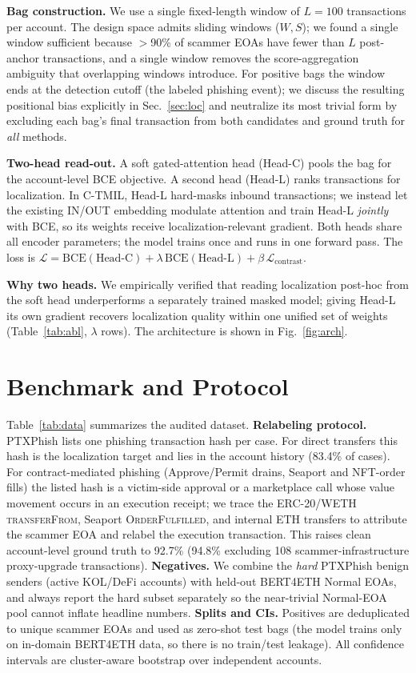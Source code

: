 \documentclass[conference]{IEEEtran}
\begin{document}
\noindent\textbf{Bag construction.} We use a single fixed-length window of
$L{=}100$ transactions per account. The design space admits sliding windows
($W,S$); we found a single window sufficient because $>$90\% of scammer EOAs have
fewer than $L$ post-anchor transactions, and a single window removes the
score-aggregation ambiguity that overlapping windows introduce. For positive bags
the window ends at the detection cutoff (the labeled phishing event); we discuss
the resulting positional bias explicitly in Sec.~\ref{sec:loc} and neutralize its
most trivial form by excluding each bag's final transaction from both candidates
and ground truth for \emph{all} methods.

\noindent\textbf{Two-head read-out.} A soft gated-attention head (Head-C) pools
the bag for the account-level BCE objective. A second head (Head-L) ranks
transactions for localization. In C-TMIL, Head-L hard-masks inbound transactions;
we instead let the existing IN/OUT embedding modulate attention and train Head-L
\emph{jointly} with BCE, so its weights receive localization-relevant gradient.
Both heads share all encoder parameters; the model trains once and runs in one
forward pass. The loss is $\mathcal{L}=\mathrm{BCE}(\text{Head-C})+\lambda\,
\mathrm{BCE}(\text{Head-L})+\beta\,\mathcal{L}_{\text{contrast}}$.

\noindent\textbf{Why two heads.} We empirically verified that reading localization
post-hoc from the soft head underperforms a separately trained masked model;
giving Head-L its own gradient recovers localization quality within one unified
set of weights (Table~\ref{tab:abl}, $\lambda$ rows). The architecture is shown in
Fig.~\ref{fig:arch}.

\section{Benchmark and Protocol}\label{sec:bench}
Table~\ref{tab:data} summarizes the audited dataset.
\textbf{Relabeling protocol.} PTXPhish lists one phishing transaction hash per
case. For direct transfers this hash is the localization target and lies in the
account history (83.4\% of cases). For contract-mediated phishing (Approve/Permit
drains, Seaport and NFT-order fills) the listed hash is a victim-side approval or a
marketplace call whose value movement occurs in an execution receipt; we trace the
ERC-20/WETH \textsc{transferFrom}, Seaport \textsc{OrderFulfilled}, and internal
ETH transfers to attribute the scammer EOA and relabel the execution transaction.
This raises clean account-level ground truth to 92.7\% (94.8\% excluding 108
scammer-infrastructure proxy-upgrade transactions).
\textbf{Negatives.} We combine the \emph{hard} PTXPhish benign senders (active
KOL/DeFi accounts) with held-out BERT4ETH Normal EOAs, and always report the hard
subset separately so the near-trivial Normal-EOA pool cannot inflate headline
numbers.
\textbf{Splits and CIs.} Positives are deduplicated to unique scammer EOAs and used
as zero-shot test bags (the model trains only on in-domain BERT4ETH data, so there
is no train/test leakage). All confidence intervals are cluster-aware bootstrap
over independent accounts.
\end{document}
